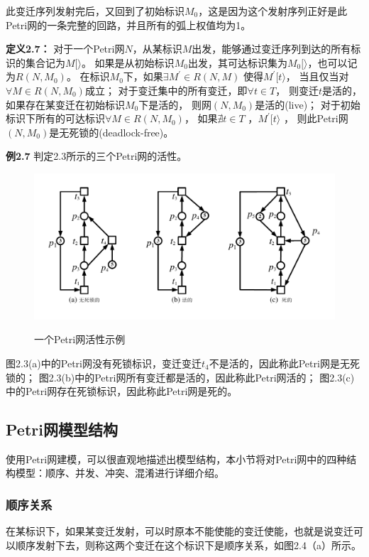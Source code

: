     此变迁序列发射完后，又回到了初始标识$M_0$，这是因为这个发射序列正好是此Petri网的一条完整的回路，并且所有的弧上权值均为1。

    \textbf{定义2.7}\cite{murata1989petri}\textbf{：}
    对于一个Petri网$N$，从某标识$M$出发，能够通过变迁序列到达的所有标识的集合记为$M[\rangle$。
    如果是从初始标识$M_{0}$出发，其可达标识集为$M_{0}[\rangle$，也可以记为$R(N,M_{0})$。
    在标识$M_{0}$下，如果$\exists M^{\prime}\in R(N,M)$ 使得$M^{\prime}[t\rangle$，
    当且仅当对$\forall M \in R(N,M_{0})$成立；
    对于变迁集中的所有变迁，即$\forall t \in T$，
    则变迁$t$是活的，如果存在某变迁在初始标识$M_0$下是活的，
    则网$(N,M_{0})$是活的(live)；
    对于初始标识下所有的可达标识$\forall M \in R(N,M_{0})$，
    如果$\nexists t \in T$ ，$M^{\prime}[t\rangle$ ，
    则此Petri网$(N,M_{0})$是无死锁的(deadlock-free)。

    \textbf{例2.7}\hspace{0.5em}
    判定2.3所示的三个Petri网的活性。

    \begin{figure}[H]
        \centering
        \includegraphics[scale=0.7,angle=0]{figures/figure2-3.pdf}\\
        \caption{一个Petri网活性示例}
    \end{figure}

    图2.3(a)中的Petri网没有死锁标识，变迁变迁$t_{4}$不是活的，因此称此Petri网是无死锁的；
    图2.3(b)中的Petri网所有变迁都是活的，因此称此Petri网活的；
    图2.3(c)中的Petri网存在死锁标识，因此称此Petri网是死的。
    \subsection{Petri网模型结构}
    使用Petri网建模，可以很直观地描述出模型结构\cite{petri}，本小节将对Petri网中的四种结构模型：顺序、并发、冲突、混淆进行详细介绍。
    \subsubsection{顺序关系}
    在某标识下，如果某变迁发射，可以时原本不能使能的变迁使能，也就是说变迁可以顺序发射下去，则称这两个变迁在这个标识下是顺序关系，如图2.4（a）所示。

